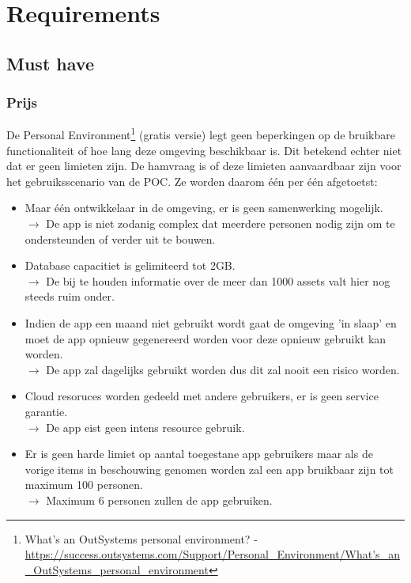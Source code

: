 \section{Requirements}

\subsection{Must have}

\subsubsection{Prijs}
\label{subsec:os-prijs}

De Personal Environment\footnote{What's an OutSystems personal environment? - \url{https://success.outsystems.com/Support/Personal_Environment/What's_an_OutSystems_personal_environment}} (gratis versie) legt geen beperkingen op de bruikbare functionaliteit of hoe lang deze omgeving beschikbaar is. Dit betekend echter niet dat er geen limieten zijn. De hamvraag is of deze limieten aanvaardbaar zijn voor het gebruiksscenario van de POC. Ze worden daarom één per één afgetoetst:

\begin{itemize}
    \item Maar één ontwikkelaar in de omgeving, er is geen samenwerking mogelijk.\\
    $\rightarrow$ De app is niet zodanig complex dat meerdere personen nodig zijn om te ondersteunden of verder uit te bouwen.
    \item Database capacitiet is gelimiteerd tot 2GB.\\
    $\rightarrow$ De bij te houden informatie over de meer dan 1000 assets valt hier nog steeds ruim onder.
    \item Indien de app een maand niet gebruikt wordt gaat de omgeving 'in slaap' en moet de app opnieuw gegenereerd worden voor deze opnieuw gebruikt kan worden.\\
    $\rightarrow$ De app zal dagelijks gebruikt worden dus dit zal nooit een risico worden.
    \item Cloud resoruces worden gedeeld met andere gebruikers, er is geen service garantie.\\
    $\rightarrow$ De app eist geen intens resource gebruik. 
    \item Er is geen harde limiet op aantal toegestane app gebruikers maar als de vorige items in beschouwing genomen worden zal een app bruikbaar zijn tot maximum 100 personen.\\
    $\rightarrow$ Maximum 6 personen zullen de app gebruiken.
\end{itemize}


